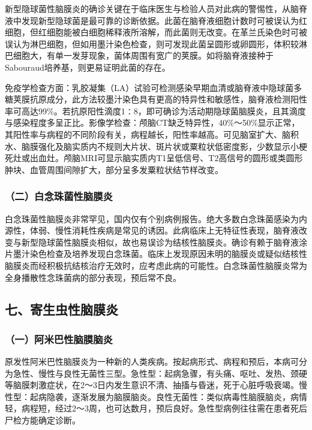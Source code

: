 新型隐球菌性脑膜炎的确诊关键在于临床医生与检验人员对此病的警惕性，从脑脊液中发现新型隐球菌是最可靠的诊断依据。此菌在脑脊液细胞计数时可被误认为红细胞，但红细胞能被白细胞稀释液所溶解，而此菌则无改变。在革兰氏染色时可被误认为淋巴细胞，但如用墨汁染色检查，则可发现此菌呈圆形或卵圆形，体积较淋巴细胞大，有单一发芽现象，菌体周围有宽广的荚膜。如将脑脊液接种于Sabouraud培养基，则更易证明此菌的存在。

免疫学检查方面：乳胶凝集（LA）试验可检测感染早期血清或脑脊液中隐球菌多糖荚膜抗原成分，此方法较墨汁染色具有更高的特异性和敏感性，脑脊液检测阳性率可高达99\%。若抗原阳性滴度1∶8，即可确诊为活动期隐球菌脑膜炎，且其滴度与感染程度多呈正比。影像学检查：颅脑CT缺乏特异性，40\%～50\%显示正常，其阳性率与病程的不同阶段有关，病程越长，阳性率越高。可见脑室扩大、脑积水、脑膜强化及脑实质内不规则大片状、斑片状或粟粒状低密度影，少数显示小梗死灶或出血灶。颅脑MRI可显示脑实质内T1呈低信号、T2高信号的圆形或类圆形肿块、血管周围间隙扩大，部分呈多发粟粒状结节样改变。

\subsubsection{（二）白念珠菌性脑膜炎}

白念珠菌性脑膜炎非常罕见，国内仅有个别病例报告。绝大多数白念珠菌感染为内源性，体弱、慢性消耗性疾病是常见的诱因。此病临床上无特征性表现，脑脊液改变与新型隐球菌性脑膜炎相似，故也易误诊为结核性脑膜炎。确诊有赖于脑脊液涂片墨汁染色检查及培养发现白念珠菌。临床上发现原因未明的脑膜炎或疑似结核性脑膜炎而经积极抗结核治疗无效时，应考虑此病的可能性。白念珠菌性脑膜炎常为全身播散性念珠菌病的部分表现，预后常不良。

\protect\hypertarget{text00390.html}{}{}

\subsection{七、寄生虫性脑膜炎}

\subsubsection{（一）阿米巴性脑膜脑炎}

原发性阿米巴性脑膜炎为一种新的人类疾病。按起病形式、病程和预后，本病可分为急性、慢性与良性无菌性三型。急性型：起病急骤，有头痛、呕吐、发热、颈硬等脑膜刺激症状，在2～3日内发生意识不清、抽搐与昏迷，死于心脏呼吸衰竭。慢性型：起病隐袭，逐渐发展为脑膜脑炎。良性无菌性：类似病毒性脑膜脑炎，病情轻，病程短，经过2～3周，也可达数月，预后良好。急性型病例往往需在患者死后尸检方能确定诊断。

